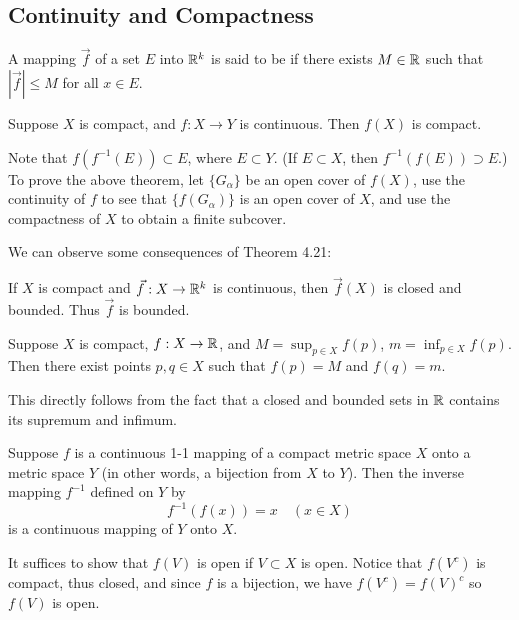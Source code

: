 \documentclass{article}
\begin{document}
\subsection{Continuity and Compactness}
\begin{definition}
    A mapping $\vec{f}$ of a set $E$ into $\mathbb R^{k}$ is said to be  if there exists $M\in\mathbb R$ such that $|\vec{f}|\leq M$ for all $x\in E$.
\end{definition}
\begin{theorem}
    Suppose $X$ is compact, and $f:X\rightarrow Y$ is continuous. Then $f(X)$ is compact.
\end{theorem}
\begin{remark}
    Note that $f(f^{-1}(E))\subset E$, where $E\subset Y$. (If $E\subset X$, then $f^{-1}(f(E))\supset E$.) To prove the above theorem, let $\{G_{\alpha}\}$ be an open cover of $f(X)$, use the continuity of $f$ to see that $\{f(G_{\alpha})\}$ is an open cover of $X$, and use the compactness of $X$ to obtain a finite subcover.
\end{remark}
We can observe some consequences of Theorem 4.21:
\begin{theorem}
    If $X$ is compact and $\vec{f}:X\rightarrow\mathbb R^{k}$ is continuous, then $\vec{f}(X)$ is closed and bounded. Thus $\vec{f}$ is bounded.
\end{theorem}
\begin{theorem}
    Suppose $X$ is compact, $f:X\rightarrow\mathbb R$, and $M=\sup_{p\in X}f(p)$, $m=\inf_{p\in X}f(p)$. Then there exist points $p,q\in X$ such that $f(p)=M$ and $f(q)=m$.
\end{theorem}
\begin{remark}
    This directly follows from the fact that a closed and bounded sets in $\mathbb R$ contains its supremum and infimum.
\end{remark}
\begin{theorem}
    Suppose $f$ is a continuous 1-1 mapping of a compact metric space $X$ onto a metric space $Y$ (in other words, a bijection from $X$ to $Y$). Then the inverse mapping $f^{-1}$ defined on $Y$ by \[f^{-1}(f(x))=x\quad(x\in X)\]is a continuous mapping of $Y$ onto $X$.
\end{theorem}
\begin{remark}
    It suffices to show that $f(V)$ is open if $V\subset X$ is open. Notice that $f(V^{c})$ is compact, thus closed, and since $f$ is a bijection, we have $f(V^{c})=f(V)^{c}$ so $f(V)$ is open. 
\end{remark}
\end{document}
